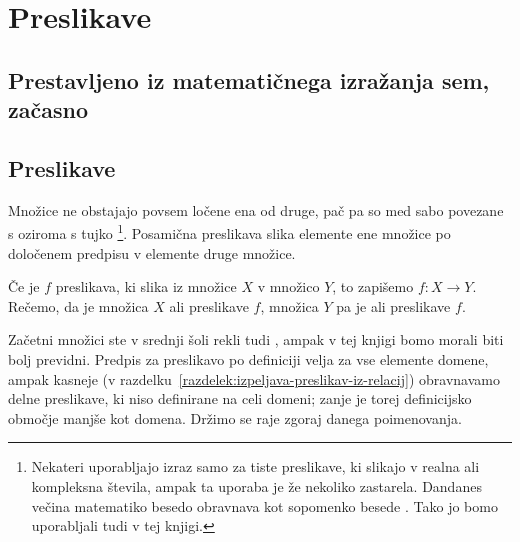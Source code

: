 \chapter{Preslikave}


\section{Prestavljeno iz matematičnega izražanja sem, začasno}
\label{sec:prest-iz-matem}



\section{Preslikave}

Množice ne obstajajo povsem ločene ena od druge, pač pa so med sabo povezane s  oziroma s tujko \footnote{Nekateri uporabljajo izraz  samo za tiste preslikave, ki slikajo v realna ali kompleksna števila, ampak ta uporaba je že nekoliko zastarela. Dandanes večina matematiko besedo  obravnava kot sopomenko besede . Tako jo bomo uporabljali tudi v tej knjigi.}. Posamična preslikava slika elemente ene množice po določenem predpisu v elemente druge množice.

Če je $f$ preslikava, ki slika iz množice $X$ v množico $Y$, to zapišemo $f\colon X \to Y$. Rečemo, da je množica $X$  ali  preslikave $f$, množica $Y$ pa je  ali  preslikave $f$.

Začetni množici ste v srednji šoli rekli tudi , ampak v tej knjigi bomo morali biti bolj previdni. Predpis za preslikavo po definiciji velja za vse elemente domene, ampak kasneje (v razdelku~\ref{razdelek:izpeljava-preslikav-iz-relacij}) obravnavamo delne preslikave, ki niso definirane na celi domeni; zanje je torej definicijsko območje manjše kot domena. Držimo se raje zgoraj danega poimenovanja.

